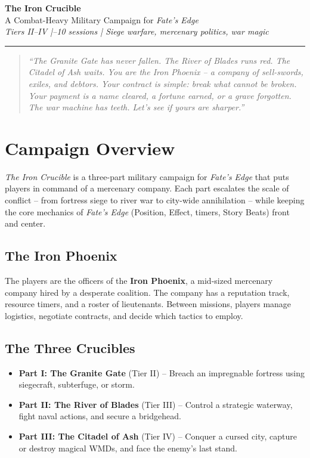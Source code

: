 \documentclass[11pt]{article}
\begin{document}


\begin{center}
{\LARGE \textbf{The Iron Crucible}}\\[4pt]
{\large A Combat-Heavy Military Campaign for \emph{Fate's Edge}}\\[2pt]
\textit{Tiers II--IV \;|--10 sessions \;|\; Siege warfare, mercenary politics, war magic}
\end{center}

\hrule
\vspace{0.5em}

\begin{quote}
\small
\textit{``The Granite Gate has never fallen. The River of Blades runs red. The Citadel of Ash waits. You are the Iron Phoenix -- a company of sell-swords, exiles, and debtors. Your contract is simple: break what cannot be broken. Your payment is a name cleared, a fortune earned, or a grave forgotten. The war machine has teeth. Let's see if yours are sharper.''}
\end{quote}

\section*{Campaign Overview}

\emph{The Iron Crucible} is a three-part military campaign for \emph{Fate's Edge} that puts players in command of a mercenary company. Each part escalates the scale of conflict -- from fortress siege to river war to city-wide annihilation -- while keeping the core mechanics of \emph{Fate's Edge} (Position, Effect, timers, Story Beats) front and center.

\subsection*{The Iron Phoenix}

The players are the officers of the \textbf{Iron Phoenix}, a mid-sized mercenary company hired by a desperate coalition. The company has a reputation track, resource timers, and a roster of lieutenants. Between missions, players manage logistics, negotiate contracts, and decide which tactics to employ.

\subsection*{The Three Crucibles}
\begin{itemize}
\item \textbf{Part I: The Granite Gate} (Tier II) -- Breach an impregnable fortress using siegecraft, subterfuge, or storm.
\item \textbf{Part II: The River of Blades} (Tier III) -- Control a strategic waterway, fight naval actions, and secure a bridgehead.
\item \textbf{Part III: The Citadel of Ash} (Tier IV) -- Conquer a cursed city, capture or destroy magical WMDs, and face the enemy's last stand.
\end{itemize}
\end{document}
